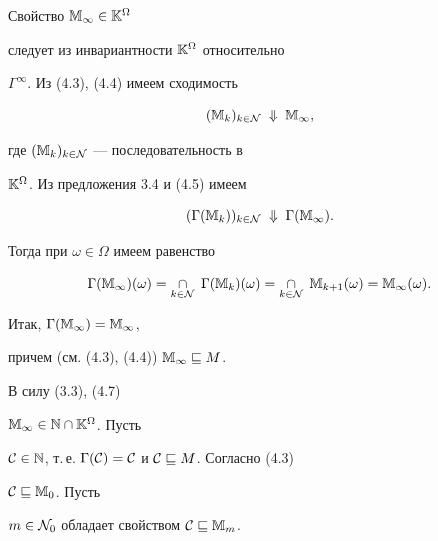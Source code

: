 \begin{pf}


Свойство ${{\Bbb M}_\infty} \in {{\Bbb K}^\Omega}$


следует из инвариантности ${\Bbb K}^\Omega$ относительно


${\Gamma}^\infty$. Из (4.3), (4.4) имеем сходимость


\begin{equation}


({\Bbb M}_k)_{k \in {\cal N}}\;\Downarrow\;{{\Bbb M}_\infty},


\end{equation}


где $({\Bbb M}_k)_{k \in {\cal N}}$ --- последовательность в


${\Bbb K}^\Omega$. Из предложения 3.4 и (4.5) имеем


\begin{equation}


({\Gamma}({\Bbb M}_k))_{k \in {\cal N}}\;\Downarrow\;


{\Gamma}({\Bbb M}_\infty).


\end{equation}


Тогда при $\omega \in \Omega$ имеем равенство


\begin{equation}


{\Gamma}({\Bbb M}_\infty)(\omega) =


\mathop{\cap}\limits_{k \in {\cal N}}\; {\Gamma}({\Bbb M}_k)(\omega) =


\mathop{\cap}\limits_{k \in {\cal N}}\; {{\Bbb M}_{k+1}}(\omega) =


{{\Bbb M}_\infty}(\omega).


\end{equation}


Итак, ${\Gamma}({\Bbb M}_\infty) = {{\Bbb M}_\infty}$,


причем (см. (4.3), (4.4)) ${{\Bbb M}_\infty} \sqsubseteq M$.


В силу (3.3), (4.7)


${{\Bbb M}_\infty} \in {\Bbb N} \cap {{\Bbb K}^\Omega}$. Пусть


${\cal C} \in {\Bbb N}$, т.\,е. ${{\Gamma}({\cal C})} =


{\cal C}$ и ${\cal C} \sqsubseteq M$. Согласно (4.3)


${\cal C} \sqsubseteq {{\Bbb M}_0}$. Пусть


$m \in {{\cal N}_0}$ обладает свойством ${\cal C} \sqsubseteq {{\Bbb M}_m}$.



\end{pf}
